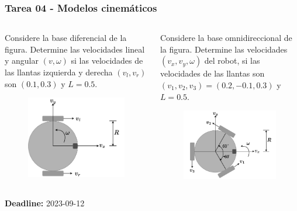 \begin{frame}\frametitle{Tarea 04 - Modelos cinemáticos}
  \begin{columns}
    \begin{column}{0.45\textwidth}
      Considere la base diferencial de la figura. Determine las velocidades lineal y angular $(v, \omega)$ si las velocidades de las llantas izquierda y derecha $(v_l, v_r)$ son $(0.1, 0.3)$ y $L=0.5$.
      \begin{figure}
        \centering
        \includegraphics[width=0.5\textheight]{Figures/DifferentialBase.pdf}
      \end{figure}
    \end{column}
    \begin{column}{0.45\textwidth}
      Considere la base omnidireccional de la figura. Determine las velocidades $(v_x, v_y, \omega)$ del robot, si las velocidades de las llantas son $(v_1,v_2,v_3) = (0.2, -0.1, 0.3)$ y $L=0.5$.
      \begin{figure}
        \centering
        \includegraphics[width=0.5\textheight]{Figures/Omnidirectional3wheels_b.pdf}
      \end{figure}
    \end{column}
  \end{columns}
  \[\]
  \textbf{Deadline:} 2023-09-12
\end{frame}

